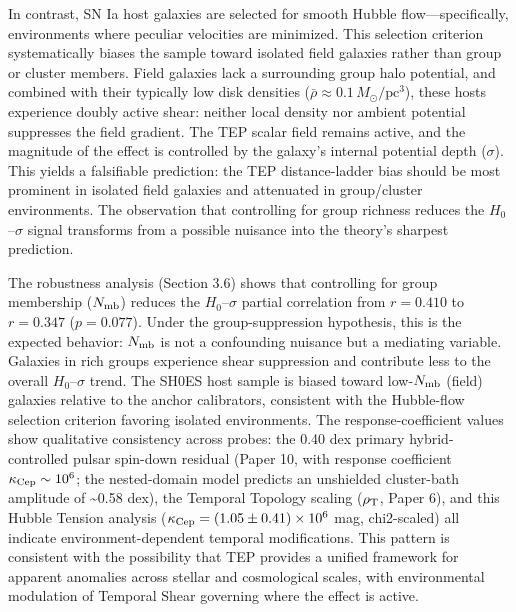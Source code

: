 \documentclass[
]{article}
\begin{document}
In contrast, SN Ia host galaxies are selected for smooth Hubble
flow---specifically, environments where peculiar velocities are
minimized. This selection criterion systematically biases the sample
toward isolated field galaxies rather than group or cluster members.
Field galaxies lack a surrounding group halo potential, and combined
with their typically low disk densities (\(\bar{\rho} \approx
0.1\,M_\odot/\text{pc}^3\)), these hosts experience doubly active shear:
neither local density nor ambient potential suppresses the field
gradient. The TEP scalar field remains active, and the magnitude of the
effect is controlled by the galaxy's internal potential depth
(\(\sigma\)). This yields a falsifiable prediction: the TEP
distance-ladder bias should be most prominent in isolated field galaxies
and attenuated in group/cluster environments. The observation that
controlling for group richness reduces the \(H_0\)--\(\sigma\) signal
transforms from a possible nuisance into the theory's sharpest
prediction.

The robustness analysis (Section 3.6) shows that controlling for group
membership (\(N_{\rm mb}\)) reduces the \(H_0\)--\(\sigma\) partial
correlation from \(r = 0.410\) to \(r = 0.347\) (\(p = 0.077\)). Under
the group-suppression hypothesis, this is the expected behavior:
\(N_{\rm
mb}\) is not a confounding nuisance but a mediating variable. Galaxies
in rich groups experience shear suppression and contribute less to the
overall \(H_0\)--\(\sigma\) trend. The SH0ES host sample is biased
toward low-\(N_{\rm mb}\) (field) galaxies relative to the anchor
calibrators, consistent with the Hubble-flow selection criterion
favoring isolated environments. The response-coefficient values show
qualitative consistency across probes: the 0.40 dex primary
hybrid-controlled pulsar spin-down residual (Paper 10, with response
coefficient \(\kappa_{\rm Cep}\sim10^6\); the nested-domain model
predicts an unshielded cluster-bath amplitude of \textasciitilde0.58
dex), the Temporal Topology scaling (\(\rho_{\rm T}\), Paper 6), and
this Hubble Tension analysis
(\(\kappa_{\rm Cep} = (1.05 \pm 0.41)\times10^6\) mag, chi2-scaled) all
indicate environment-dependent temporal modifications. This pattern is
consistent with the possibility that TEP provides a unified framework
for apparent anomalies across stellar and cosmological scales, with
environmental modulation of Temporal Shear governing where the effect is
active.
\end{document}
